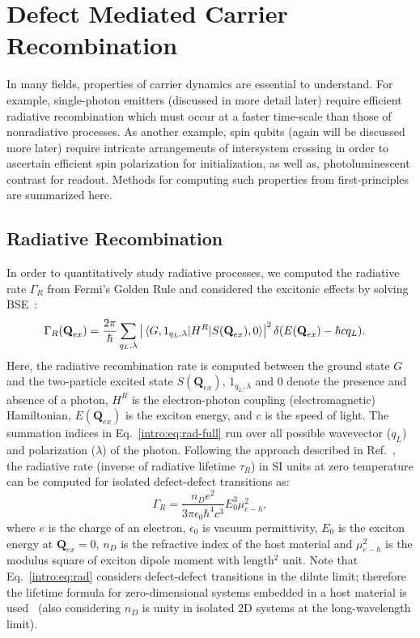 \section{Defect Mediated Carrier Recombination}

In many fields, properties of carrier dynamics are essential to understand. For example, single-photon emitters (discussed in more detail later) require efficient radiative recombination which must occur at a faster time-scale than those of nonradiative processes. As another example, spin qubits (again will be discussed more later) require intricate arrangements of intersystem crossing in order to ascertain efficient spin polarization for initialization, as well as, photoluminescent contrast for readout. Methods for computing such properties from first-principles are summarized here.

\subsection{Radiative Recombination}
In order to quantitatively study radiative processes, we computed the radiative rate $\Gamma_R$ from Fermi's Golden Rule and considered the excitonic effects by solving BSE~\cite{wu2019dimensionality}:
\begin{align}
    \Gamma_R (\textbf{Q}_{ex}) &=
    \frac{2\pi}{\hbar}
    \sum_{q_L, \lambda}
    \left|
        \mel{G,1_{q_L,\lambda}}
        {H^R}
        {S(\textbf{Q}_{ex}),0}
    \right|^2
    \delta(E(\textbf{Q}_{ex}) -\hbar c q_L).
    \label{intro:eq:rad-full}
\end{align}
Here, the radiative recombination rate is computed between the ground state $G$ and the two-particle excited state $S(\textbf{Q}_{ex})$, $1_{q_L,\lambda}$ and 0 denote the presence and absence of a photon, $H^R$ is the electron-photon coupling (electromagnetic) Hamiltonian,  $E(\textbf{Q}_{ex})$ is the exciton energy, and $c$ is the speed of light.
The summation indices in Eq.~\ref{intro:eq:rad-full} run over all possible wavevector ($q_L$) and polarization ($\lambda$) of the photon.
Following the approach described in Ref.~\cite{wu2019dimensionality}, the radiative rate (inverse of radiative lifetime $\tau_R$) in SI units at zero temperature can be computed for isolated defect-defect transitions as:
\begin{equation}
     \Gamma_R = \frac{n_D e^2}{3\pi\epsilon_0\hbar^4 c^3} E_0^3 \mu_{e-h}^2,
    \label{intro:eq:rad}
\end{equation}
where $e$ is the charge of an electron, $\epsilon_0$ is vacuum permittivity, $E_0$ is the exciton energy at $\textbf{Q}_{ex}=0$, $n_D$ is the refractive index of the host material and $\mu_{e-h}^2$ is the modulus square of exciton dipole moment with length$^2$ unit. Note that Eq.~\ref{intro:eq:rad} considers defect-defect transitions in the dilute limit; therefore the lifetime formula for zero-dimensional systems embedded in a host material is used~\cite{gupta2018two,mackoit2019carbon} (also considering $n_D$ is unity in isolated 2D systems at the long-wavelength limit).


